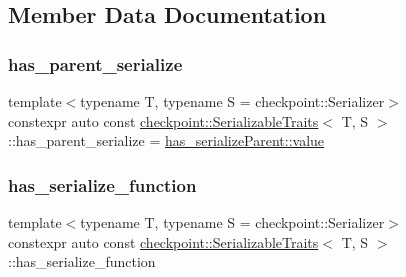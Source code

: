 \subsection{Member Data Documentation}
\mbox{\label{structcheckpoint_1_1_serializable_traits_a122e712dd9adffac78f239a7c30b0a8f}} 
\subsubsection{\texorpdfstring{has\+\_\+parent\+\_\+serialize}{has\_parent\_serialize}}
{\footnotesize\ttfamily template$<$typename T, typename S = checkpoint\+::\+Serializer$>$ \\
constexpr auto const \hyperlink{structcheckpoint_1_1_serializable_traits}{checkpoint\+::\+Serializable\+Traits}$<$ T, S $>$\+::has\+\_\+parent\+\_\+serialize = \hyperlink{structdetection_1_1detector_a6d7d0e1bdf5903db9edbe448edccf83b}{has\+\_\+serialize\+Parent\+::value}\hspace{0.3cm}{\ttfamily [static]}}

\mbox{\label{structcheckpoint_1_1_serializable_traits_a4d17a7627a8e033cccb5cf4e6b8fd0dc}} 
\subsubsection{\texorpdfstring{has\+\_\+serialize\+\_\+function}{has\_serialize\_function}}
{\footnotesize\ttfamily template$<$typename T, typename S = checkpoint\+::\+Serializer$>$ \\
constexpr auto const \hyperlink{structcheckpoint_1_1_serializable_traits}{checkpoint\+::\+Serializable\+Traits}$<$ T, S $>$\+::has\+\_\+serialize\+\_\+function\hspace{0.3cm}{\ttfamily [static]}}

